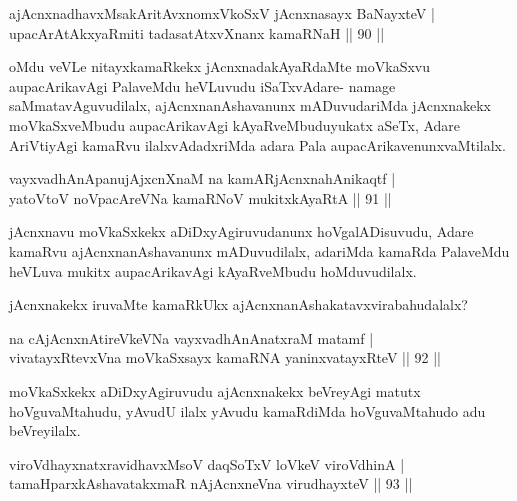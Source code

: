 \begin{shl}
ajAcnxnadhavxMsakAritAvxnomxVkoSxV jAcnxnasayx BaNayxteV |\\
upacArAtAkxyaRmiti tadasatAtxvXnanx kamaRNaH \hfill || 90 ||
\end{shl} 

\begin{artha}
oMdu veVLe nitayxkamaRkekx jAcnxnadakAyaRdaMte moVkaSxvu aupacArikavAgi PalaveMdu heVLuvudu iSaTxvAdare- namage saMmatavAguvudilalx, ajAcnxnanAshavanunx mADuvudariMda jAcnxnakekx moVkaSxveMbudu aupacArikavAgi kAyaRveMbuduyukatx aSeTx, Adare AriVtiyAgi kamaRvu ilalxvAdadxriMda adara Pala aupacArikavenunxvaMtilalx.
\end{artha}

\begin{shl}
vayxvadhAnApanujAjxcnXnaM na kamARjAcnxnahAnikaqtf |\\
yatoV\s toV noVpacAreVNa kamaRNoV mukitxkAyaRtA \hfill || 91 ||
\end{shl}

\begin{artha}
jAcnxnavu moVkaSxkekx aDiDxyAgiruvudanunx hoVgalADisuvudu, Adare kamaRvu ajAcnxnanAshavanunx mADuvudilalx, adariMda kamaRda PalaveMdu heVLuva mukitx aupacArikavAgi kAyaRveMbudu hoMduvudilalx.
\end{artha}

\begin{artha}
jAcnxnakekx iruvaMte kamaRkUkx ajAcnxnanAshakatavxvirabahudalalx?
\end{artha}


\begin{shl}
na cAjAcnxnAtireVkeVNa vayxvadhAnAnatxraM matamf |\\
vivatayxRtevxVna moVkaSxsayx kamaRNA yaninxvatayxRteV \hfill || 92 ||
\end{shl}

\begin{artha}
moVkaSxkekx aDiDxyAgiruvudu ajAcnxnakekx beVreyAgi matutx hoVguvaMtahudu, yAvudU ilalx yAvudu kamaRdiMda hoVguvaMtahudo adu beVreyilalx.
\end{artha}

\begin{shl}
viroVdhayxnatxravidhavxMsoV daqSoTxV loVkeV viroVdhinA |\\
tamaHparxkAshavatakxmaR nAjAcnxneVna virudhayxteV \hfill || 93 ||
\end{shl}

